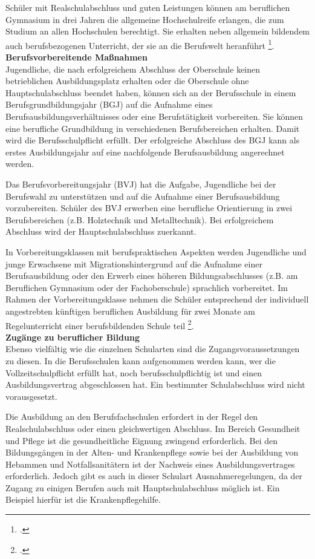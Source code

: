 Schüler mit Realschulabschluss und guten Leistungen können am beruflichen Gymnasium in drei Jahren die allgemeine Hochschulreife erlangen, die zum Studium an allen Hochschulen berechtigt. Sie erhalten neben allgemein bildendem auch berufsbezogenen Unterricht, der sie an die Berufswelt heranführt \footcites[vgl.]{SBSBSSSK2015}[vgl.][4ff]{SMKSK2013}.\\

\textbf{Berufsvorbereitende Maßnahmen}\\
Jugendliche, die nach erfolgreichem Abschluss der Oberschule keinen betrieblichen Ausbildungsplatz erhalten oder die Oberschule ohne Hauptschulabschluss beendet haben, können sich an der Berufsschule in einem Berufsgrundbildungsjahr (BGJ) auf die Aufnahme eines Berufsausbildungsverhältnisses oder eine Berufstätigkeit vorbereiten. Sie können eine berufliche Grundbildung in verschiedenen Berufsbereichen erhalten. Damit wird die Berufsschulpflicht erfüllt. Der erfolgreiche Abschluss des BGJ kann als erstes Ausbildungsjahr auf eine nachfolgende Berufsausbildung angerechnet werden.

Das Berufsvorbereitungsjahr (BVJ) hat die Aufgabe, Jugendliche bei der Berufswahl zu unterstützen und auf die Aufnahme einer Berufsausbildung vorzubereiten. Schüler des BVJ erwerben eine berufliche Orientierung in zwei Berufsbereichen (z.B. Holztechnik und Metalltechnik). Bei erfolgreichem Abschluss wird der Hauptschulabschluss zuerkannt.

In Vorbereitungsklassen mit berufspraktischen Aspekten werden Jugendliche und junge Erwachsene mit Migrationshintergrund auf die Aufnahme einer Berufsausbildung oder den Erwerb eines höheren Bildungsabschlusses (z.B. am Beruflichen Gymnasium oder der Fachoberschule) sprachlich vorbereitet. Im Rahmen der Vorbereitungsklasse nehmen die Schüler entsprechend der individuell angestrebten künftigen beruflichen Ausbildung für zwei Monate am Regelunterricht einer berufsbildenden Schule teil \footcite[vgl.][15ff]{SMKSK2013}.\\

\textbf{Zugänge zu beruflicher Bildung}\\
Ebenso vielfältig wie die einzelnen Schularten sind die Zugangsvoraussetzungen zu diesen. In die Berufsschulen kann aufgenommen werden kann, wer die Vollzeitschulpflicht erfüllt hat, noch berufsschulpflichtig ist und einen Ausbildungsvertrag abgeschlossen hat. Ein bestimmter Schulabschluss wird nicht vorausgesetzt.

Die Ausbildung an den Berufsfachschulen erfordert in der Regel den Realschulabschluss oder einen gleichwertigen Abschluss. Im Bereich Gesundheit und Pflege ist die gesundheitliche Eignung zwingend erforderlich. Bei den Bildungsgängen in der Alten- und Krankenpflege sowie bei der Ausbildung von Hebammen und Notfallsanitätern ist der Nachweis eines Ausbildungsvertrages erforderlich. Jedoch gibt es auch in dieser Schulart Ausnahmeregelungen, da der Zugang zu einigen Berufen auch mit Hauptschulabschluss möglich ist. Ein Beispiel hierfür ist die Krankenpflegehilfe.
 
